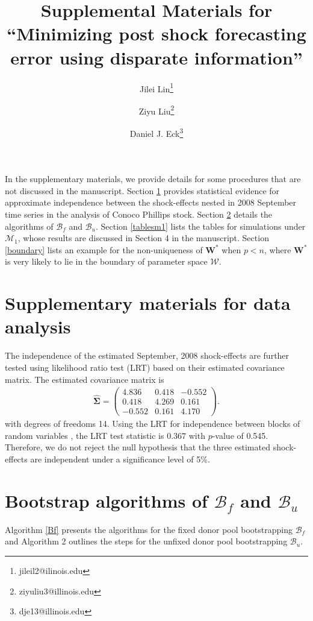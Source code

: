 \documentclass[11pt]{article}
\title{Supplemental Materials for ``Minimizing post shock forecasting error using disparate information''}
\author{Jilei Lin\thanks{jileil2@ilinois.edu}}
\author{Ziyu Liu\thanks{ziyuliu3@illinois.edu}}
\author{Daniel J. Eck\thanks{dje13@illinois.edu}}
\affil{Department of Statistics, University of Illinois at Urbana-Champaign}
\def\mbf#1{\mathbf{#1}} %
\def\mc#1{\mathcal{#1}} %
\theoremstyle{definition}
\begin{document}
\maketitle

In the supplementary materials, we provide details for some procedures that are not discussed in the manuscript. Section \ref{smfda} provides statistical evidence for approximate independence between  the shock-effects nested in 2008 September time series in the analysis of Conoco Phillips stock. Section \ref{bf} details the algorithms of $\mc{B}_f$ and $\mc{B}_u$. Section  \ref{tablesm1} lists the tables for simulations under $\mc{M}_1$, whose results are discussed in Section 4 in the manuscript. Section \ref{boundary} lists an example for the non-uniqueness of $\mbf{W}^*$ when $p < n$, where $\mbf{W}^*$ is very likely to lie in the boundary of parameter space $\mc{W}$.


\section{Supplementary materials for data analysis}
\label{smfda}
The independence of the estimated September, 2008 shock-effects are further tested using likelihood ratio test (LRT) based on their estimated covariance matrix. The estimated covariance matrix is
\begin{align*}
  \hat{\mathbf{\Sigma}}=\left(\begin{array}{rrr}
    4.836 & 0.418 & -0.552 \\
    0.418 & 4.269 & 0.161 \\
    -0.552 & 0.161 & 4.170
  \end{array}\right).
\end{align*}
with degrees of freedoms 14. Using the LRT for independence between blocks of random variables \citep[Section 10.2]{msos}, the LRT test statistic is $0.367$ with $p$-value of 0.545. Therefore, we do not reject  the null hypothesis that the three estimated shock-effects are independent under a significance level of 5\%. 

\section{Bootstrap algorithms of  $\mc{B}_f$ and $\mc{B}_u$}
\label{bf}

Algorithm \ref{Bf} presents the algorithms for the fixed donor pool bootstrapping  $\mc{B}_f$ and Algorithm 2 outlines the steps for the unfixed donor pool bootstrapping $\mc{B}_u$.
\end{document}
